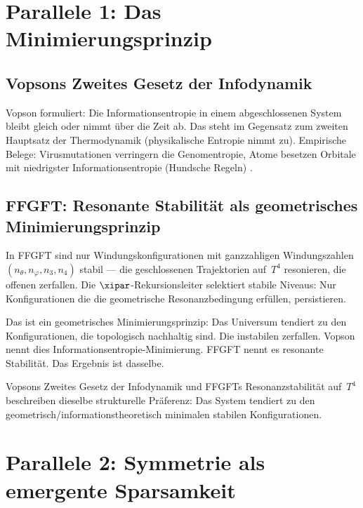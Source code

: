 \section{Parallele 1: Das Minimierungsprinzip}

\subsection{Vopsons Zweites Gesetz der Infodynamik}

Vopson formuliert: Die Informationsentropie in einem abgeschlossenen System
bleibt gleich oder nimmt über die Zeit ab. Das steht im Gegensatz zum zweiten
Hauptsatz der Thermodynamik (physikalische Entropie nimmt zu). Empirische
Belege: Virusmutationen verringern die Genomentropie, Atome besetzen Orbitale
mit niedrigster Informationsentropie (Hundsche Regeln) \cite{Vopson2023}.

\subsection{FFGFT: Resonante Stabilität als geometrisches Minimierungsprinzip}

In FFGFT sind nur Windungskonfigurationen mit ganzzahligen Windungszahlen
$(n_\theta, n_\varphi, n_3, n_4)$ stabil --- die geschlossenen Trajektorien
auf~$T^4$ resonieren, die offenen zerfallen. Die $\xipar$-Rekursionsleiter
selektiert stabile Niveaus: Nur Konfigurationen die die geometrische
Resonanzbedingung erfüllen, persistieren.

Das ist ein geometrisches Minimierungsprinzip: Das Universum tendiert zu den
Konfigurationen, die topologisch nachhaltig sind. Die instabilen zerfallen.
Vopson nennt dies Informationsentropie-Minimierung. FFGFT nennt es
resonante Stabilität. Das Ergebnis ist dasselbe.

\begin{erkenntnis}
Vopsons Zweites Gesetz der Infodynamik und FFGFTs Resonanzstabilität auf~$T^4$
beschreiben dieselbe strukturelle Präferenz: Das System tendiert zu den
geometrisch/informationstheoretisch minimalen stabilen Konfigurationen.
\end{erkenntnis}

\section{Parallele 2: Symmetrie als emergente Sparsamkeit}

